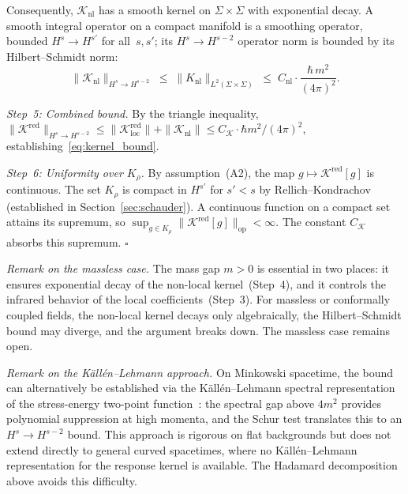 \documentclass[12pt,a4paper]{article}
\begin{document}
Consequently, $\mathcal{K}_{\mathrm{nl}}$ has a smooth kernel on
$\Sigma\times\Sigma$ with exponential decay. A smooth integral operator
on a compact manifold is a smoothing operator, bounded
$H^s\to H^{s'}$ for all~$s,s'$; its $H^s\to H^{s-2}$ operator norm
is bounded by its Hilbert--Schmidt norm:
\begin{equation}
\bigl\|\mathcal{K}_{\mathrm{nl}}\bigr\|_{H^s\to H^{s-2}}
\;\leq\; \|K_{\mathrm{nl}}\|_{L^2(\Sigma\times\Sigma)}
\;\leq\; C_{\mathrm{nl}}\cdot\frac{\hbar\,m^2}{(4\pi)^2}.
\label{eq:nl_bound}
\end{equation}

\smallskip\noindent\textit{Step~5: Combined bound.}
By the triangle inequality,
$\|\mathcal{K}^{\mathrm{red}}\|_{H^s\to H^{s-2}}
\leq \|\mathcal{K}^{\mathrm{red}}_{\mathrm{loc}}\|
+ \|\mathcal{K}_{\mathrm{nl}}\|
\leq C_{\mathcal{K}}\cdot\hbar m^2/(4\pi)^2$,
establishing~\eqref{eq:kernel_bound}.

\smallskip\noindent\textit{Step~6: Uniformity over $K_\rho$.}
By assumption~(A2), the map $g \mapsto \mathcal{K}^{\mathrm{red}}[g]$ is continuous.
The set $K_\rho$ is compact in $H^{s'}$ for $s' < s$ by Rellich--Kondrachov
(established in Section~\ref{sec:schauder}). A continuous function on a compact set
attains its supremum, so
$\sup_{g \in K_\rho}\|\mathcal{K}^{\mathrm{red}}[g]\|_{\mathrm{op}} < \infty$.
The constant $C_{\mathcal{K}}$ absorbs this supremum. \hfill$\square$

\smallskip\noindent\textit{Remark on the massless case.} The mass gap
$m > 0$ is essential in two places: it ensures exponential decay of the
non-local kernel~(Step~4), and it controls the infrared behavior of the
local coefficients~(Step~3). For massless or conformally coupled fields, the
non-local kernel decays only algebraically, the Hilbert--Schmidt bound may
diverge, and the argument breaks down. The massless case remains open.

\smallskip\noindent\textit{Remark on the K\"all\'en--Lehmann approach.}
On Minkowski spacetime, the bound can alternatively be established via the
K\"all\'en--Lehmann spectral representation of the stress-energy two-point
function~\cite{phillips_hu,hu_verdaguer}: the spectral gap above $4m^2$
provides polynomial suppression at high momenta, and the Schur test
translates this to an $H^s\to H^{s-2}$ bound. This approach is rigorous on
flat backgrounds but does not extend directly to general curved spacetimes,
where no K\"all\'en--Lehmann representation for the response kernel is
available. The Hadamard decomposition above avoids this difficulty.
\end{document}

